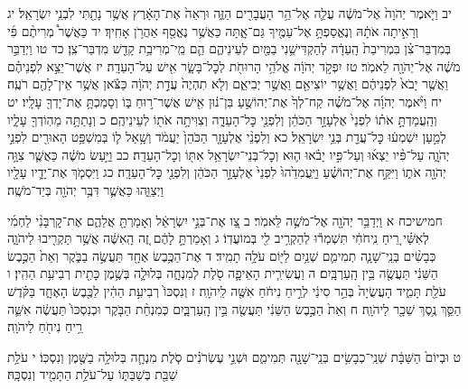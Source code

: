 \documentclass[twoside, openany, parskip=half, 11pt]{book}
\begin{document}
יב וַיֹּ֤אמֶר יְהֹוָה֙ אֶל־מֹשֶׁ֔ה עֲלֵ֛ה אֶל־הַ֥ר הָעֲבָרִ֖ים הַזֶּ֑ה וּרְאֵה֙ אֶת־הָאָ֔רֶץ אֲשֶׁ֥ר נָתַ֖תִּי לִבְנֵ֥י יִשְׂרָאֵֽל׃ יג וְרָאִ֣יתָה אֹתָ֔הּ וְנֶאֱסַפְתָּ֥ אֶל־עַמֶּ֖יךָ גַּם־אָ֑תָּה כַּאֲשֶׁ֥ר נֶאֱסַ֖ף אַהֲרֹ֥ן אָחִֽיךָ׃ יד כַּאֲשֶׁר֩ מְרִיתֶ֨ם פִּ֜י בְּמִדְבַּר־צִ֗ן בִּמְרִיבַת֙ הָֽעֵדָ֔ה לְהַקְדִּישֵׁ֥נִי בַמַּ֖יִם לְעֵינֵיהֶ֑ם הֵ֛ם מֵֽי־מְרִיבַ֥ת קָדֵ֖שׁ מִדְבַּר־צִֽן׃
כד טו וַיְדַבֵּ֣ר מֹשֶׁ֔ה אֶל־יְהֹוָ֖ה לֵאמֹֽר׃ טז יִפְקֹ֣ד יְהֹוָ֔ה אֱלֹהֵ֥י הָרוּחֹ֖ת לְכׇל־בָּשָׂ֑ר אִ֖ישׁ עַל־הָעֵדָֽה׃ יז אֲשֶׁר־יֵצֵ֣א לִפְנֵיהֶ֗ם וַאֲשֶׁ֤ר יָבֹא֙ לִפְנֵיהֶ֔ם וַאֲשֶׁ֥ר יוֹצִיאֵ֖ם וַאֲשֶׁ֣ר יְבִיאֵ֑ם וְלֹ֤א תִהְיֶה֙ עֲדַ֣ת יְהֹוָ֔ה כַּצֹּ֕אן אֲשֶׁ֥ר אֵין־לָהֶ֖ם רֹעֶֽה׃ יח וַיֹּ֨אמֶר יְהֹוָ֜ה אֶל־מֹשֶׁ֗ה קַח־לְךָ֙ אֶת־יְהוֹשֻׁ֣עַ בִּן־נ֔וּן אִ֖ישׁ אֲשֶׁר־ר֣וּחַ בּ֑וֹ וְסָמַכְתָּ֥ אֶת־יָדְךָ֖ עָלָֽיו׃ יט וְהַֽעֲמַדְתָּ֣ אֹת֗וֹ לִפְנֵי֙ אֶלְעָזָ֣ר הַכֹּהֵ֔ן וְלִפְנֵ֖י כׇּל־הָעֵדָ֑ה וְצִוִּיתָ֥ה אֹת֖וֹ לְעֵינֵיהֶֽם׃ כ וְנָתַתָּ֥ה מֵהֽוֹדְךָ֖ עָלָ֑יו לְמַ֣עַן יִשְׁמְע֔וּ כׇּל־עֲדַ֖ת בְּנֵ֥י יִשְׂרָאֵֽל׃ כא וְלִפְנֵ֨י אֶלְעָזָ֤ר הַכֹּהֵן֙ יַעֲמֹ֔ד וְשָׁ֥אַל ל֛וֹ בְּמִשְׁפַּ֥ט הָאוּרִ֖ים לִפְנֵ֣י יְהֹוָ֑ה עַל־פִּ֨יו יֵצְא֜וּ וְעַל־פִּ֣יו יָבֹ֗אוּ ה֛וּא וְכׇל־בְּנֵי־יִשְׂרָאֵ֥ל אִתּ֖וֹ וְכׇל־הָעֵדָֽה׃ כב וַיַּ֣עַשׂ מֹשֶׁ֔ה כַּאֲשֶׁ֛ר צִוָּ֥ה יְהֹוָ֖ה אֹת֑וֹ וַיִּקַּ֣ח אֶת־יְהוֹשֻׁ֗עַ וַיַּֽעֲמִדֵ֙הוּ֙ לִפְנֵי֙ אֶלְעָזָ֣ר הַכֹּהֵ֔ן וְלִפְנֵ֖י כׇּל־הָעֵדָֽה׃ כג וַיִּסְמֹ֧ךְ אֶת־יָדָ֛יו עָלָ֖יו וַיְצַוֵּ֑הוּ כַּאֲשֶׁ֛ר דִּבֶּ֥ר יְהֹוָ֖ה בְּיַד־מֹשֶֽׁה׃

חמישיכח א וַיְדַבֵּ֥ר יְהֹוָ֖ה אֶל־מֹשֶׁ֥ה לֵּאמֹֽר׃ ב צַ֚ו אֶת־בְּנֵ֣י יִשְׂרָאֵ֔ל וְאָמַרְתָּ֖ אֲלֵהֶ֑ם אֶת־קׇרְבָּנִ֨י לַחְמִ֜י לְאִשַּׁ֗י רֵ֚יחַ נִֽיחֹחִ֔י תִּשְׁמְר֕וּ לְהַקְרִ֥יב לִ֖י בְּמוֹעֲדֽוֹ׃ ג וְאָמַרְתָּ֣ לָהֶ֔ם זֶ֚ה הָֽאִשֶּׁ֔ה אֲשֶׁ֥ר תַּקְרִ֖יבוּ לַיהֹוָ֑ה כְּבָשִׂ֨ים בְּנֵֽי־שָׁנָ֧ה תְמִימִ֛ם שְׁנַ֥יִם לַיּ֖וֹם עֹלָ֥ה תָמִֽיד׃ ד אֶת־הַכֶּ֥בֶשׂ אֶחָ֖ד תַּעֲשֶׂ֣ה בַבֹּ֑קֶר וְאֵת֙ הַכֶּ֣בֶשׂ הַשֵּׁנִ֔י תַּעֲשֶׂ֖ה בֵּ֥ין הָֽעַרְבָּֽיִם׃ ה וַעֲשִׂירִ֧ית הָאֵיפָ֛ה סֹ֖לֶת לְמִנְחָ֑ה בְּלוּלָ֛ה בְּשֶׁ֥מֶן כָּתִ֖ית רְבִיעִ֥ת הַהִֽין׃ ו עֹלַ֖ת תָּמִ֑יד הָעֲשֻׂיָה֙ בְּהַ֣ר סִינַ֔י לְרֵ֣יחַ נִיחֹ֔חַ אִשֶּׁ֖ה לַֽיהֹוָֽה׃ ז וְנִסְכּוֹ֙ רְבִיעִ֣ת הַהִ֔ין לַכֶּ֖בֶשׂ הָאֶחָ֑ד בַּקֹּ֗דֶשׁ הַסֵּ֛ךְ נֶ֥סֶךְ שֵׁכָ֖ר לַיהֹוָֽה׃ ח וְאֵת֙ הַכֶּ֣בֶשׂ הַשֵּׁנִ֔י תַּעֲשֶׂ֖ה בֵּ֣ין הָֽעַרְבָּ֑יִם כְּמִנְחַ֨ת הַבֹּ֤קֶר וּכְנִסְכּוֹ֙ תַּעֲשֶׂ֔ה אִשֵּׁ֛ה רֵ֥יחַ נִיחֹ֖חַ לַיהֹוָֽה׃

ט וּבְיוֹם֙ הַשַּׁבָּ֔ת שְׁנֵֽי־כְבָשִׂ֥ים בְּנֵֽי־שָׁנָ֖ה תְּמִימִ֑ם וּשְׁנֵ֣י עֶשְׂרֹנִ֗ים סֹ֧לֶת מִנְחָ֛ה בְּלוּלָ֥ה בַשֶּׁ֖מֶן וְנִסְכּֽוֹ׃ י עֹלַ֥ת שַׁבַּ֖ת בְּשַׁבַּתּ֑וֹ עַל־עֹלַ֥ת הַתָּמִ֖יד וְנִסְכָּֽהּ׃
\end{document}
